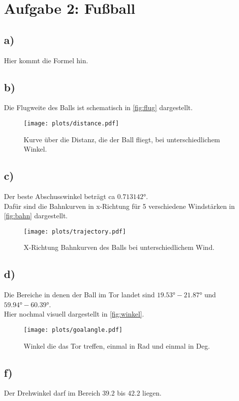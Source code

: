 \newpage
\section{Aufgabe 2: Fußball}
\label{sec:auf2}

\subsection{a)}

Hier kommt die Formel hin.

\subsection{b)}

Die Flugweite des Balls ist schematisch in \autoref{fig:flug} dargestellt.
\begin{figure}
    \centering
    \texttt{[image: plots/distance.pdf]}
    \caption{Kurve über die Distanz, die der Ball fliegt, bei unterschiedlichem Winkel.}
    \label{fig:flug}
\end{figure}

\newpage
\subsection{c)}

Der beste Abschusswinkel beträgt ca $0.713142°$.\\
Dafür sind die Bahnkurven in x-Richtung für 5 verschiedene Windstärken in \autoref{fig:bahn} dargestellt.

\begin{figure}
    \centering
    \texttt{[image: plots/trajectory.pdf]}
    \caption{X-Richtung Bahnkurven des Balls bei unterschiedlichem Wind.}
    \label{fig:bahn}
\end{figure}

\newpage
\subsection{d)}

Die Bereiche in denen der Ball im Tor landet sind $19.53° - 21.87°$ und $59.94° - 60.39°$.\\
Hier nochmal visuell dargestellt in \autoref{fig:winkel}.

\begin{figure}
    \centering
    \texttt{[image: plots/goalangle.pdf]}
    \caption{Winkel die das Tor treffen, einmal in Rad und einmal in Deg.}
    \label{fig:winkel}
\end{figure}

\subsection{f)}

Der Drehwinkel darf im Bereich $39.2$ bis $42.2$ liegen.